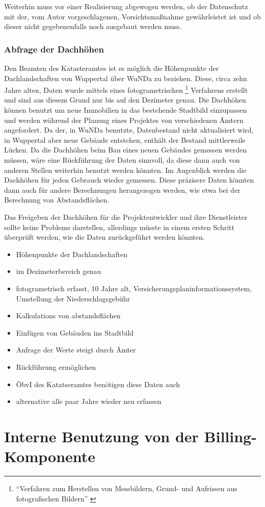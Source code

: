 Weiterhin muss vor einer Realisierung abgewogen werden, ob der Datenschutz mit der, vom Autor vorgeschlagenen, Vorsichtsmaßnahme gewährleistet ist und ob dieser nicht gegebenenfalls noch ausgebaut werden muss.

\subsection{Abfrage der Dachhöhen}
\label{subsec:dachhoehen}
Den Beamten des Katasteramtes ist es möglich die Höhenpunkte der Dachlandschaften von Wuppertal über \ac{WuNDa} zu beziehen.
Diese, circa zehn Jahre alten, Daten wurde mittels eines fotogrametrischen
\footnote{\enquote{Verfahren zum Herstellen von Messbildern, Grund- und Aufrissen aus fotografischen Bildern} \autocite{duden-foto}}
Verfahrens erstellt und sind aus diesem Grund nur bis auf den Dezimeter genau.
Die Dachhöhen können benutzt um neue Immobilien in das bestehende Stadtbild einzupassen und werden während der Planung eines Projektes von verschiedenen Ämtern angefordert.
Da der, in \ac{WuNDa} benutzte, Datenbestand nicht aktualisiert wird, in Wuppertal aber neue Gebäude entstehen, enthält der Bestand mittlerweile Lücken.
Da die Dachhöhen beim Bau eines neuen Gebäudes gemessen werden müssen, wäre eine Rückführung der Daten sinnvoll, da diese dann auch von anderen Stellen weiterhin benutzt werden könnten.
Im Augenblick werden die Dachhöhen für jeden Gebrauch wieder gemessen.
Diese präzisere Daten könnten dann auch für andere Berechnungen herangezogen werden, wie etwa bei der Berechnung von Abstandsflächen.

Das Freigeben der Dachhöhen für die Projektentwickler und ihre Dienstleister sollte keine Probleme darstellen, allerdings müsste in einem ersten Schritt überprüft werden, wie die Daten zurückgeführt werden könnten.


\begin{itemize}
\item Höhenpunkte der Dachlandschaften
\item im Dezimeterbereich genau
\item fotogrametrisch erfasst, 10 Jahre alt, Versicherungsplaninformationssystem, Umstellung der Niederschlagsgebühr
\item Kalkulations von abstandsflächen
\item Einfügen von Gebäuden ins Stadtbild
\item Anfrage der Werte steigt durch Ämter
\item Rückführung ermöglichen 
\item ÖbvI des Katatseramtes benötigen diese Daten auch
\item alternative alle paar Jahre wieder neu erfassen
\end{itemize}


\chapter{Interne Benutzung von der Billing-Komponente}